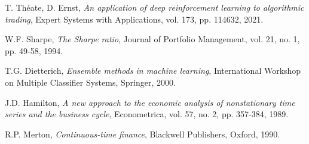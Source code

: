 \documentclass[10pt,twocolumn]{article}
\begin{document}
\begin{thebibliography}{35}
T. Théate, D. Ernst,
\textit{An application of deep reinforcement learning to algorithmic trading},
Expert Systems with Applications, vol. 173, pp. 114632, 2021.

W.F. Sharpe,
\textit{The Sharpe ratio},
Journal of Portfolio Management, vol. 21, no. 1, pp. 49-58, 1994.

T.G. Dietterich,
\textit{Ensemble methods in machine learning},
International Workshop on Multiple Classifier Systems, Springer, 2000.

J.D. Hamilton,
\textit{A new approach to the economic analysis of nonstationary time series and the business cycle},
Econometrica, vol. 57, no. 2, pp. 357-384, 1989.

R.P. Merton,
\textit{Continuous-time finance},
Blackwell Publishers, Oxford, 1990.

\end{thebibliography}
\end{document}
